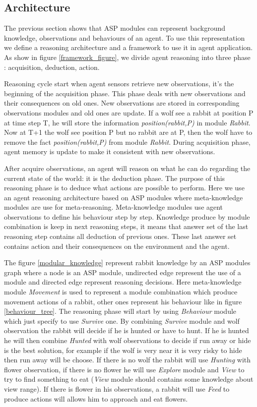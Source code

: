 \documentclass{aamas2012}
\begin{document}
\subsection{Architecture}

	The previous section shows that ASP modules can represent background knowledge, observations and behaviours of an agent.
	To use this representation we define a reasoning architecture and a framework to use it in agent application.
	As show in figure \ref{framework_figure}, we divide agent reasoning into three phase : acquisition, deduction, action.
	
	Reasoning cycle start when agent sensors retrieve new observations, it's the beginning of the acquisition phase.
	This phase deals with new observations and their consequences on old ones.
	New observations are stored in corresponding observations modules and old ones are update.
	If a wolf see a rabbit at position P at time step T, he will store the information \textit{position(rabbit,P)} in module \textit{Rabbit}.
	Now at T+1 the wolf see position P but no rabbit are at P, then the wolf have to remove the fact \textit{position(rabbit,P)} from module \textit{Rabbit}.
	During acquisition phase, agent memory is update to make it consistent with new observations.
	
	After acquire observations, an agent will reason on what he can do regarding the current state of the world: it is the deduction phase.
	The purpose of this reasoning phase is to deduce what actions are possible to perform.
	Here we use an agent reasoning architecture based on ASP modules where meta-knowledge modules are use for meta-reasoning.
	Meta-knowledge modules use agent observations to define his behaviour step by step.
	Knowledge produce by module combination is keep in next reasoning steps, 
	it means that answer set of the last reasoning step contains all deduction of previous ones.
	These last answer set contains action and their consequences on the environment and the agent.
	
	The figure \ref{modular_knowledge} represent rabbit knowledge by an ASP modules graph where a node is an ASP module, 
	undirected edge represent the use of a module and directed edge represent reasoning decisions.
	Here meta-knowledge module \textit{Movement} is used to represent a module combination which produce movement actions of a rabbit,
	other ones represent his behaviour like in figure \ref{behaviour_tree}.
	The reasoning phase will start by using \textit{Behaviour} module which just specify to use \textit{Survive} one.
	By combining \textit{Survive} module and wolf observation the rabbit will decide if he is hunted or have to hunt.
	If he is hunted he will then combine \textit{Hunted} with wolf observations to decide if run away or hide is the best solution,
	for example if the wolf is very near it is very risky to hide then run away will be choose.
	If there is no wolf the rabbit will use \textit{Hunting} with flower observation, if there is no flower he will use \textit{Explore} module
	and \textit{View} to try to find something to eat (\textit{View} module should contains some knowledge about view range).
	If there is flower in his observations, a rabbit will use \textit{Feed} to produce actions will allows him to approach and eat flowers.
	
\end{document}
